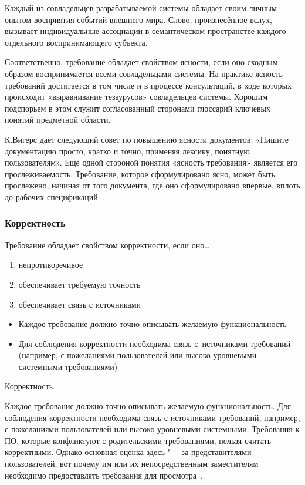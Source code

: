 \documentclass{../industrial-development}
\begin{document}
Каждый из совладельцев разрабатываемой системы обладает своим личным опытом восприятия событий внешнего мира. Слово, произнесённое вслух, вызывает индивидуальные ассоциации в семантическом пространстве каждого отдельного воспринимающего субъекта. 

Соответственно, требование обладает свойством ясности, если оно сходным образом воспринимается всеми совладельцами системы. На практике ясность требований достигается в том числе и в процессе консультаций, в ходе которых происходит «выравнивание тезаурусов» совладельцев системы. Хорошим подспорьем в этом служит согласованный сторонами глоссарий ключевых понятий предметной области.

К.Вигерс даёт следующий совет по повышению ясности документов: «Пишите документацию просто, кратко и точно, применяя лексику, понятную пользователям». Ещё одной стороной понятия «ясность требования» является его прослеживаемость. Требование, которое
сформулировано ясно, может быть прослежено, начиная от того документа, где оно сформулировано впервые, вплоть до рабочих спецификаций~\cite[с.~15]{Maglinec}.


\begin{frame} \frametitle{Корректность}

Требование обладает свойством \alert{корректности}, если оно\dots
\begin{enumerate}
\item непротиворечивое
\item обеспечивает требуемую точность
\item обеспечивает связь с источниками
\end{enumerate}
 \begin{itemize}
\item Каждое требование должно точно описывать желаемую функциональность
\item Для соблюдения корректности необходима связь с~источниками требований (например, с пожеланиями пользователей или высоко-уровневыми системными требованиями)
 \end{itemize}
\end{frame}

\lecturenotes

\alert{Корректность}

Каждое требование должно точно описывать желаемую функциональность. Для соблюдения корректности необходима связь с источниками требований, например, с пожеланиями пользователей или высоко-уровневыми системными. Требования к ПО, которые конфликтуют с родительскими требованиями, нельзя считать корректными. Однако основная оценка здесь "--- за представителями пользователей, вот почему им или их непосредственным заместителям необходимо предоставлять требования для просмотра~\cite[с.~24]{Wiegers}.
\end{document}
